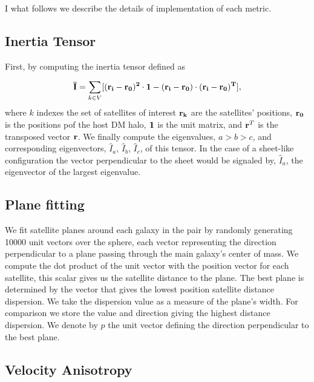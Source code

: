 \documentclass[a4paper,fleqn,usenatbib]{mnras}
\begin{document}
I what follows we describe the details of implementation of each
metric.


\subsection{Inertia Tensor}
\label{sub:inertia}
First, by computing the inertia tensor defined as 

\begin{equation}
{\bf{\bar{I}}} = \sum_{k \in V}[(\bf{r}_i - \bf{r}_0)^2\cdot \bf{1} -
  (\bf{r}_i-\bf{r}_0)\cdot (\bf{r}_i - \bf{r}_0)^{T}],
\end{equation}
%
where $k$ indexes the set of satellites of interest
$\bf{r}_k$ are the satellites' positions, $\bf{r}_{0}$ is the
positions pof the host DM halo, $\bf{1}$ is the unit matrix,  and
${\bf r}^T$ is the transposed vector $\bf{r}$. 
We finally compute the eigenvalues, $a>b>c$, and corresponding
eigenvectors, $\hat{I}_a$, $\hat{I}_b$, $\hat{I}_c$, of this tensor.
In the case of a sheet-like configuration the vector perpendicular to
the sheet would be signaled by, $\hat{I}_a$, the eigenvector of the
largest eigenvalue. 


\subsection{Plane fitting}
\label{sub:planes}

We fit satellite planes around each galaxy in the pair by randomly
generating 10000 unit vectors over the  sphere, each vector
representing the direction perpendicular to a plane passing through
the main galaxy's center of mass. 
We compute the dot product of the unit vector with the position vector
for each satellite, this scalar gives us the satellite distance to the
plane. 
The best plane is determined by the vector that gives the lowest
position satellite distance dispersion. 
We take the dispersion value as a measure of the plane's width.
For comparison we store the value and direction giving the
highest distance dispersion.
We denote by $\hat{p}$ the unit vector defining the direction
perpendicular to the best plane.


\subsection{Velocity Anisotropy}
\label{sub:beta}
\end{document}
